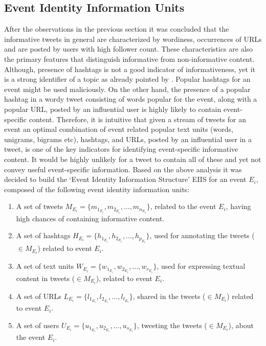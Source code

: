 \subsection{Event Identity Information Units}
After the observations in the previous section it was concluded that the informative tweets in general are characterized by wordiness, occurrences of URLs and are posted by users with high follower count. These characteristics are also the primary features that distinguish informative from non-informative content. Although, presence of hashtags is not a good indicator of informativeness, yet it is a strong identifier of a topic as already pointed by \cite{laniado2010making}. Popular hashtags for an event might be used maliciously. On the other hand, the presence of a popular hashtag in a wordy tweet consisting of words popular for the event, along with a popular URL, posted by an influential user is highly likely to contain event-specific content. Therefore, it is intuitive that given a stream of tweets for an event an optimal combination of event related popular text units (words, unigrams, bigrams etc),  hashtags, and URLs, posted by an influential user in a tweet, is one of the key indicators for identifying event-specific informative content. It would be highly unlikely for a tweet to contain all of these and yet not convey useful event-specific information. Based on the above analysis it was decided to build the `Event Identity Information Structure' EIIS for an event $E_{i}$, composed of the following event identity information units:

\begin{enumerate}
\item A set of tweets $M_{E_{i}} = {\{m_{1_{E_{i}}},m_{2_{E_{i}}}, ... ,m_{n_{E_{i}}}\}}$, related to the event $E_{i}$, having high chances of containing informative content.
\item A set of hashtags $H_{E_{i}} = \{h_{1_{E_{i}}},h_{2_{E_{i}}},..., h_{p_{E_{i}}} \}$, used for annotating the tweets ($\in M_{E_{i}}$) related to event $E_{i}$.
\item A set of text units $W_{E_{i}} = \{w_{1_{E_{i}}},w_{2_{E_{i}}},..., w_{r_{E_{i}}} \}$, used for expressing textual content in tweets ($\in M_{E_{i}}$), related to event $E_{i}$.
\item A set of URLs $L_{E_{i}} = \{l_{1_{E_{i}}},l_{2_{E_{i}}},..., l_{t_{E_{i}}} \}$, shared in the tweets ($\in M_{E_{i}}$) related to event $E_{i}$.
\item A set of users $U_{E_{i}} = \{u_{1_{E_{i}}},u_{2_{E_{i}}},..., u_{s_{E_{i}}} \}$, tweeting the tweets ($\in M_{E_{i}}$), about the event $E_{i}$.
\end{enumerate}


